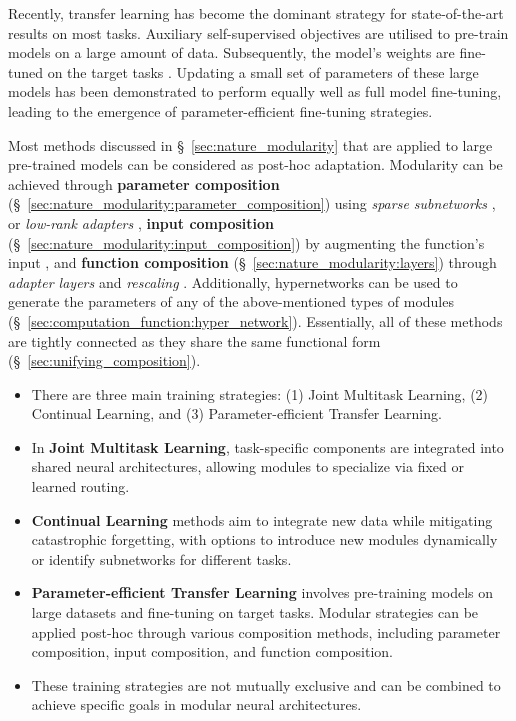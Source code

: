 \documentclass[10pt]{article} %
\begin{document}
Recently, transfer learning has become the dominant strategy for state-of-the-art results on most tasks. Auxiliary self-supervised objectives are utilised to pre-train models on a large amount of data. Subsequently, the model's weights are fine-tuned on the target tasks \citep{Howard2018ulmfit,Devlin:2019bert}. Updating a small set of parameters of these large models has been demonstrated to perform equally well as full model fine-tuning, leading to the emergence of parameter-efficient fine-tuning strategies.

Most methods discussed in \S~\ref{sec:nature_modularity} that are applied to large pre-trained models can be considered as post-hoc adaptation. Modularity can be achieved through \textbf{parameter composition} (\S~\ref{sec:nature_modularity:parameter_composition}) using \textit{sparse subnetworks} \citep{Mehta2019, chen2020lottery,donahue2014decaf,Cai2020tinytl,ben-zaken-etal-2022-bitfit,guo-etal-2021-parameter}, or \textit{low-rank adapters} \citep{Li2018intrinsic, hu2021lora}, \textbf{input composition} (\S~\ref{sec:nature_modularity:input_composition}) by augmenting the function's input \citep{brown2020language, Li2020PrefixTuning}, and \textbf{function composition} (\S~\ref{sec:nature_modularity:layers}) through \textit{adapter layers} \citep{Rebuffi2017Adapters1,houlsby2019parameter} and \textit{rescaling} \citep{Liu2022IA3}. Additionally, hypernetworks can be used to generate the parameters of any of the above-mentioned types of modules (\S~\ref{sec:computation_function:hyper_network}). Essentially, all of these methods are tightly connected as they share the same functional form (\S~\ref{sec:unifying_composition}).

 \begin{tcolorbox}{%
    \begin{itemize}
      \setlength\itemsep{-.1em}
        \item There are three main training strategies: (1) Joint Multitask Learning, (2) Continual Learning, and (3) Parameter-efficient Transfer Learning.
        \item In \textbf{Joint Multitask Learning}, task-specific components are integrated into shared neural architectures, allowing modules to specialize via fixed or learned routing.
        \item \textbf{Continual Learning} methods aim to integrate new data while mitigating catastrophic forgetting, with options to introduce new modules dynamically or identify subnetworks for different tasks.
        \item \textbf{Parameter-efficient Transfer Learning} involves pre-training models on large datasets and fine-tuning on target tasks. Modular strategies can be applied post-hoc through various composition methods, including parameter composition, input composition, and function composition.
        \item These training strategies are not mutually exclusive and can be combined to achieve specific goals in modular neural architectures.
    \end{itemize}
}%
\end{tcolorbox}
\end{document}
